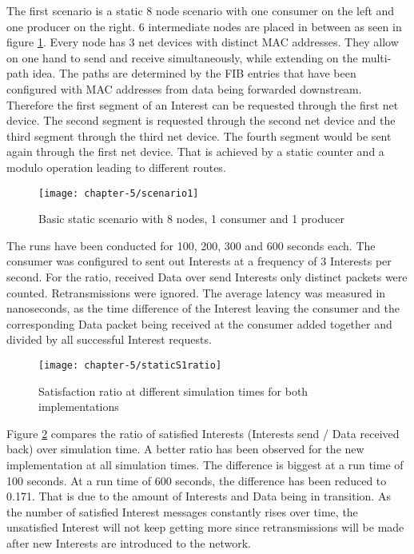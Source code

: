 The first scenario is a static 8 node scenario with one consumer on the left and one producer on the right. 6 intermediate nodes are placed in between as seen in figure \ref{fig:scenario1}. Every node has 3 net devices with distinct MAC addresses. They allow on one hand to send and receive simultaneously, while extending on the multi-path idea. The paths are determined by the FIB entries that have been configured with MAC addresses from data being forwarded downstream. Therefore the first segment of an Interest can be requested through the first net device. The second segment is requested through the second net device and the third segment through the third net device. The fourth segment would be sent again through the first net device. That is achieved by a static counter and a modulo operation leading to different routes.

\vspace{5mm} %

\begin{figure}[H]
  \centering
  \texttt{[image: chapter-5/scenario1]}
  \caption{Basic static scenario with 8 nodes, 1 consumer and 1 producer}
  \label{fig:scenario1}
\end{figure}

\vspace{5mm} %

The runs have been conducted for 100, 200, 300 and 600 seconds each. The consumer was configured to sent out Interests at a frequency of 3 Interests per second. For the ratio, received Data over send Interests only distinct packets were counted. Retransmissions were ignored. The average latency was measured in nanoseconds, as the time difference of the Interest leaving the consumer and the corresponding Data packet being received at the consumer added together and divided by all successful Interest requests.

\vspace{5mm} %

\begin{figure}[H]
  \centering
  \texttt{[image: chapter-5/staticS1ratio]}
  \caption{Satisfaction ratio at different simulation times for both implementations}
  \label{fig:staticS1ratio}
\end{figure}

\vspace{5mm} %

Figure \ref{fig:staticS1ratio} compares the ratio of satisfied Interests (Interests send / Data received back) over simulation time. A better ratio has been observed for the new implementation at all simulation times. The difference is biggest at a run time of 100 seconds. At a run time of 600 seconds, the difference has been reduced to 0.171. That is due to the amount of Interests and Data being in transition. As the number of satisfied Interest messages constantly rises over time, the unsatisfied Interest will not keep getting more since retransmissions will be made after new Interests are introduced to the network.

